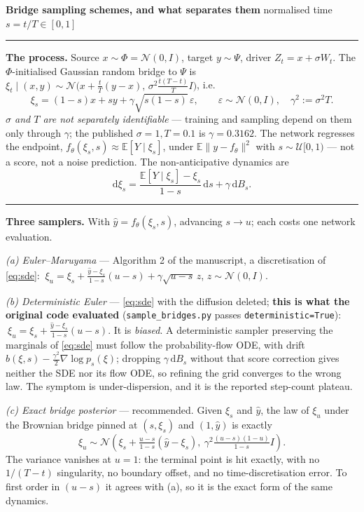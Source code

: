 \documentclass[9pt,a4paper]{extarticle}
\def\E{\mathbb{E}}
\def\N{\mathcal{N}}
\begin{document}
{\large\bfseries Bridge sampling schemes, and what separates them}\hfill
{\small normalised time $s=t/T\in[0,1]$}
\vspace{2pt}\hrule\vspace{4pt}

\textbf{The process.} Source $x\sim\Phi=\N(0,I)$, target $y\sim\Psi$, driver
$Z_t=x+\sigma W_t$. The $\Phi$-initialised Gaussian random bridge to $\Psi$ is
$\xi_t\mid(x,y)\sim\N\big(x+\tfrac{t}{T}(y-x),\,\sigma^2\tfrac{t(T-t)}{T}I\big)$, i.e.
\begin{equation}
\xi_s=(1-s)x+sy+\gamma\sqrt{s(1-s)}\,\varepsilon,\qquad
\varepsilon\sim\N(0,I),\quad \gamma^2:=\sigma^2T .
\end{equation}
\emph{$\sigma$ and $T$ are not separately identifiable} --- training and sampling
depend on them only through $\gamma$; the published $\sigma=1,T=0.1$ is
$\gamma=0.3162$. The network regresses the endpoint,
$f_\theta(\xi_s,s)\approx\E[Y\mid\xi_s]$, under $\E\|y-f_\theta\|^2$ with
$s\sim\mathcal{U}[0,1)$ --- not a score, not a noise prediction. The
non-anticipative dynamics are
\begin{equation}
\label{eq:sde}
\mathrm{d}\xi_s=\frac{\E[Y\mid\xi_s]-\xi_s}{1-s}\,\mathrm{d}s+\gamma\,\mathrm{d}B_s .
\end{equation}

\vspace{1pt}\hrule\vspace{4pt}

\textbf{Three samplers.} With $\hat y=f_\theta(\xi_s,s)$, advancing $s\to u$; each
costs one network evaluation.

\emph{(a) Euler--Maruyama} --- Algorithm 2 of the manuscript, a discretisation of
\eqref{eq:sde}: $\ \xi_u=\xi_s+\tfrac{\hat y-\xi_s}{1-s}(u-s)+\gamma\sqrt{u-s}\,z$,
$z\sim\N(0,I)$.

\emph{(b) Deterministic Euler} --- \eqref{eq:sde} with the diffusion deleted;
\textbf{this is what the original code evaluated} (\texttt{sample\_bridges.py}
passes \texttt{deterministic=True}): $\ \xi_u=\xi_s+\tfrac{\hat y-\xi_s}{1-s}(u-s)$.
It is \emph{biased}. A deterministic sampler preserving the marginals of
\eqref{eq:sde} must follow the probability-flow ODE, with drift
$b(\xi,s)-\tfrac{\gamma^2}{2}\nabla\!\log p_s(\xi)$; dropping $\gamma\,\mathrm{d}B_s$
without that score correction gives neither the SDE nor its flow ODE, so refining
the grid converges to the wrong law. The symptom is under-dispersion, and it is
the reported step-count plateau.

\emph{(c) Exact bridge posterior} --- recommended. Given $\xi_s$ and $\hat y$, the
law of $\xi_u$ under the Brownian bridge pinned at $(s,\xi_s)$ and $(1,\hat y)$ is
exactly
\begin{equation}
\xi_u\sim\N\!\left(\xi_s+\tfrac{u-s}{1-s}(\hat y-\xi_s),\
\gamma^2\tfrac{(u-s)(1-u)}{1-s}I\right).
\end{equation}
The variance vanishes at $u=1$: the terminal point is hit exactly, with no
$1/(T-t)$ singularity, no boundary offset, and no time-discretisation error. To
first order in $(u-s)$ it agrees with (a), so it is the exact form of the same
dynamics.
\end{document}

